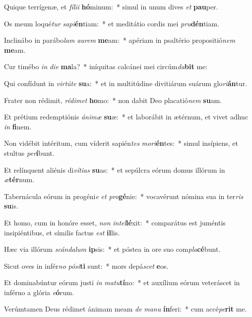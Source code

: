 \item Quique terrígenæ, et \textit{fí}\textit{li}\textit{i} \textbf{hó}minum:~* simul in unum dives \textit{et} \textbf{pau}per.
\item Os meum loqué\textit{tur} \textit{sa}\textit{pi}\textbf{én}tiam:~* et meditátio cordis mei \textit{pru}\textbf{dén}tiam.
\item Inclinábo in parábo\textit{lam} \textit{au}\textit{rem} \textbf{me}am:~* apériam in psaltério propositió\textit{nem} \textbf{me}am.
\item Cur timébo \textit{in} \textit{di}\textit{e} \textbf{ma}la?~* iníquitas calcánei mei circúm\textit{da}\textbf{bit} me:
\item Qui confídunt in \textit{vir}\textit{tú}\textit{te} \textbf{su}a:~* et in multitúdine divitiárum suárum glo\textit{ri}\textbf{án}tur.
\item Frater non rédimit, \textit{réd}\textit{i}\textit{met} \textbf{ho}mo:~* non dabit Deo placatió\textit{nem} \textbf{su}am.
\item Et prétium redemptiónis \textit{á}\textit{ni}\textit{mæ} \textbf{su}æ:~* et laborábit in ætérnum, et vivet adhuc \textit{in} \textbf{fi}nem.
\item Non vidébit intéritum, cum víderit sapién\textit{tes} \textit{mo}\textit{ri}\textbf{én}tes:~* simul insípiens, et stultus \textit{per}\textbf{í}bunt.
\item Et relínquent aliénis di\textit{ví}\textit{ti}\textit{as} \textbf{su}as:~* et sepúlcra eórum domus illórum in \textit{æ}\textbf{tér}num.
\item Tabernácula eórum in progéni\textit{e} \textit{et} \textit{pro}\textbf{gé}nie:~* vocavérunt nómina sua in ter\textit{ris} \textbf{su}is.
\item Et homo, cum in honóre esset, \textit{non} \textit{in}\textit{tel}\textbf{lé}xit:~* comparátus est juméntis insipiéntibus, et símilis factus \textit{est} \textbf{il}lis.
\item Hæc via illórum \textit{scán}\textit{da}\textit{lum} \textbf{ip}sis:~* et póstea in ore suo com\textit{pla}\textbf{cé}bunt.
\item Sicut oves in infér\textit{no} \textit{pó}\textit{si}\textbf{ti} sunt:~* mors depá\textit{scet} \textbf{e}os.
\item Et dominabúntur eórum justi \textit{in} \textit{ma}\textit{tu}\textbf{tí}no:~* et auxílium eórum veteráscet in inférno a glória \textit{e}\textbf{ó}rum.
\item Verúmtamen Deus rédimet ánimam meam \textit{de} \textit{ma}\textit{nu} \textbf{ín}feri:~* cum accé\textit{pe}\textbf{rit} me.
